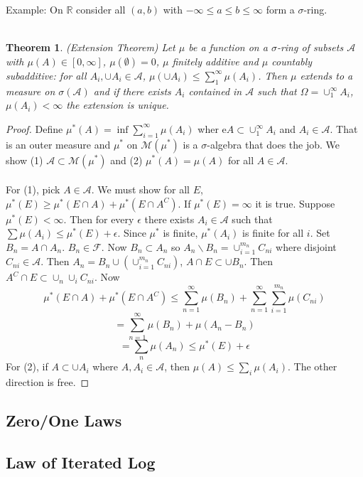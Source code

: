 \documentclass[12pt]{article}
\newtheorem{theorem}{Theorem}
\begin{document}
Example: On $\mathbb{R}$ consider all $(a, b)$ with $-\infty \le a \le b \le \infty$ form a $\sigma$-ring.
\\ \\
\begin{theorem}
(Extension Theorem) Let $\mu$ be a function on a $\sigma$-ring of subsets $\mathcal{A}$ with $\mu(A) \in [0, \infty]$, $\mu(\emptyset) = 0$, $\mu$ finitely additive and $\mu$ countably subadditive: for all $A_i, \cup A_i \in \mathcal{A}$, $\mu(\cup A_i) \le \sum_1^\infty \mu(A_i)$.  Then $\mu$ extends to a measure on $\sigma(\mathcal{A})$ and if there exists $A_i$ contained in $\mathcal{A}$ such that $\Omega = \cup_1^\infty A_i$, $\mu(A_i) < \infty$ the extension is unique.
\end{theorem}
\begin{proof}
Define $\mu^*(A) = \inf \sum_{i=1}^\infty \mu(A_i)$ wher e$A \subset \cup_1^\infty A_i$ and $A_i \in \mathcal{A}$.  That is an outer measure and $\mu^*$ on $\mathcal{M}(\mu^*)$ is a $\sigma$-algebra that does the job.  We show (1) $\mathcal{A} \subset \mathcal{M}(\mu^*)$ and (2) $\mu^*(A) = \mu(A)$ for all $A \in \mathcal{A}$.
\\ \\
For (1), pick $A \in \mathcal{A}$.  We must show for all $E$, $\mu^*(E) \ge \mu^*(E \cap A) + \mu^*(E \cap A^C)$.  If $\mu^*(E) = \infty$ it is true.  Suppose $\mu^*(E) < \infty$.  Then for every $\epsilon$ there exists $A_i \in \mathcal{A}$ such that $\sum \mu(A_i) \le \mu^*(E) + \epsilon$.  Since $\mu^*$ is finite, $\mu^*(A_i)$ is finite for all $i$.  Set $B_n = A \cap A_n$. $B_n \in \mathcal{F}$.  Now $B_n \subset A_n$ so $A_n \backslash B_n = \cup_{i=1}^{m_n} C_{ni}$ where disjoint $C_{ni} \in \mathcal{A}$.  Then $A_n = B_n \cup (\cup_{i=1}^{m_n} C_{ni})$, $A \cap E \subset \cup B_n$.  Then $A^C \cap  E \subset \cup_n \cup_i C_{ni}$.  Now 
$$\mu^*(E \cap A) + \mu^*(E \cap A^C) \le \sum_{n=1}^\infty \mu(B_n) + \sum_{n=1}^\infty \sum_{i=1}^{m_n} \mu(C_{ni})$$
$$ = \sum_{n=1}^\infty \mu(B_n) + \mu(A_n - B_n)$$
$$ = \sum_n \mu(A_n) \le \mu^*(E) + \epsilon$$
For (2), if $A \subset \cup A_i$ where $A, A_i \in \mathcal{A}$, then $\mu(A) \le \sum_i \mu(A_i)$.  The other direction is free.
\end{proof}


\subsection{Zero/One Laws}

\subsection{Law of Iterated Log}
\end{document}
